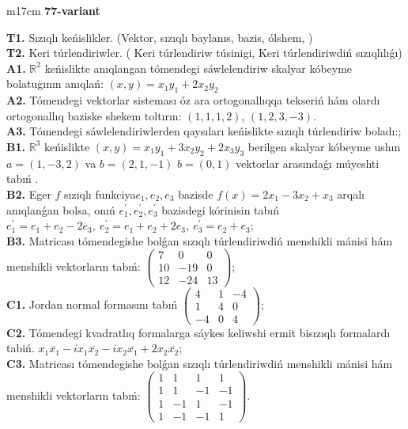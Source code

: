 \documentclass{article}
\begin{document}
\begin{tabular}{m{17cm}}
\end{tabular}
\vspace{1cm}


\begin{tabular}{m{17cm}}
\textbf{77-variant}
\newline

\textbf{T1.} Sızıqlı keńislikler.   (Vektor,  sızıqlı baylanıs, bazis, ólshem, )  \\
\textbf{T2.} Keri túrlendiriwler. ( Keri túrlendiriw túsinigi,   Keri túrlendiriwdiń sızıqlılıǵı) \\
\textbf{A1.} \(\mathbb{R}^{2}\) keńislikte anıqlangan tómendegi sáwlelendiriw skalyar kóbeyme bolatuģının anıqlań: \((x,y) = x_{1}y_{1} + 2x_{2}y_{2}\) \\
\textbf{A2.} Tómendegi vektorlar sisteması óz ara ortogonallıqqa tekseriń hám olardı ortogonallıq baziske shekem toltırın: \((1,1,1,2)\), \((1,2,3, - 3)\). \\
\textbf{A3.} Tómendegi sáwlelendiriwlerden qaysıları keńislikte sızıqlı túrlendiriw boladı:; \\
\textbf{B1.} \(\mathbb{R}^{3}\) keńislikte \((x,y) = x_{1}y_{1} + 3x_{2}y_{2} + 2x_{3}y_{3}\) berilgen skalyar kóbeyme ushın \(a = (1, - 3,2)\) va \(b = (2,1, - 1)\) \(b = (0,1)\) vektorlar arasındaǵı múyeshti tabıń . \\
\textbf{B2.} Eger \(f\) sızıqlı funkciya\(e_{1},e_{2},e_{3}\) bazisde \(f(x) = 2x_{1} - 3x_{2} + x_{3}\) arqalı anıqlanǵan bolsa, onıń \(e_{1}^{'},e_{2}^{'},e_{3}^{'}\) bazisdegi kórinisin tabıń\(e_{1}^{'} = e_{1} + e_{2} - 2e_{3},\ e_{2}^{'} = e_{1} + e_{2} + 2e_{3},\ e_{3}^{'} = e_{2} + e_{3}\); \\
\textbf{B3.} Matricası tómendegishe bolǵan sızıqlı túrlendiriwdiń menshikli mánisi hám menshikli vektorların tabıń: \(\begin{pmatrix} 7 & 0 & 0 \\ 10 & - 19 & 0 \\ 12 & - 24 & 13 \end{pmatrix}\); \\
\textbf{C1.} Jordan normal formasını tabıń \(\begin{pmatrix} 4 & 1 & - 4 \\ 1 & 4 & 0 \\  - 4 & 0 & 4 \end{pmatrix}\); \\
\textbf{C2.} Tómendegi kvadratlıq formalarga sáykes keliwshi ermit bisızıqlı formalardı tabiń. \(x_{1}\overline{x_{1}} - ix_{1}\overline{x_{2}} - ix_{2}\overline{x_{1}} + 2x_{2}\overline{x_{2}}\); \\
\textbf{C3.} Matricası tómendegishe bolǵan sızıqlı túrlendiriwdiń menshikli mánisi hám menshikli vektorların tabıń: \(\begin{pmatrix} 1 & 1 & 1 & 1 \\ 1 & 1 & - 1 & - 1 \\ 1 & - 1 & 1 & - 1 \\ 1 & - 1 & - 1 & 1 \end{pmatrix}\). \\

\end{tabular}
\vspace{1cm}
\end{document}

